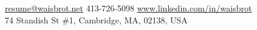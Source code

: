 \documentclass[10pt,a4paper]{article}
\begin{document}
\sloppy  %


\nobreakvspace{0.3em}  %

\noindent\href{mailto:resume@waisbrot.net}{resume@waisbrot.net} \sbull
{} 413-726-5098 \sbull
\href{https://www.linkedin.com/in/waisbrot}{www.linkedin.com/in/waisbrot}
\\
74 Standish St \#1, Cambridge, MA, 02138, USA

\spacedhrule{0.9em}{-0.4em}  %

\end{document}

